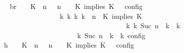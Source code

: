 \begin{isabellebody}
\ \isamarkupfalse%
\ br{}{\isacharcolon}\ {\isacartoucheopen}{\isasymrho}\ {\isasymin}\ {\isasymlbrakk}\ {\isacharparenleft}{\isacharparenleft}K\ {\isasymnot}{\isasymUp}\ n{\isacharparenright}\ {\isacharhash}\ {\isasymGamma}{\isacharparenright}{\isacharcomma}\ n\ {\isasymturnstile}\ {\isasymPsi}\ {\isasymtriangleright}\ {\isacharparenleft}{\isacharparenleft}K\ implies\ K\ {\isacharhash}\ {\isasymPhi}{\isacharparenright}\ {\isasymrbrakk}\isactrlsub c\isactrlsub o\isactrlsub n\isactrlsub f\isactrlsub i\isactrlsub g\isanewline
\ \ \ \ \ \ \ \ \ \ \ \ \ \ \ \ {\isasymLongrightarrow}\ {\isasymexists}{\isasymGamma}\isactrlsub k\ {\isasymPsi}\isactrlsub k\ {\isasymPhi}\isactrlsub k\ k{\isachardot}\ {\isacharparenleft}{\isacharparenleft}{\isasymGamma}{\isacharcomma}\ n\ {\isasymturnstile}\ {\isacharparenleft}{\isacharparenleft}K\ implies\ K\ {\isacharhash}\ {\isasymPsi}{\isacharparenright}\ {\isasymtriangleright}\ {\isasymPhi}{\isacharparenright}\isanewline
\ \ \ \ \ \ \ \ \ \ \ \ \ \ \ \ \ \ \ \ \ \ \ \ \ \ \ \ \ \ \ \ \ \ \ \ {\isasymhookrightarrow}\isactrlbsup k\isactrlesup \ {\isacharparenleft}{\isasymGamma}\isactrlsub k{\isacharcomma}\ Suc\ n\ {\isasymturnstile}\ {\isasymPsi}\isactrlsub k\ {\isasymtriangleright}\ {\isasymPhi}\isactrlsub k{\isacharparenright}{\isacharparenright}\isanewline
\ \ \ \ \ \ \ \ \ \ \ \ \ \ \ \ \ \ {\isasymand}\ {\isasymrho}\ {\isasymin}\ {\isasymlbrakk}\ {\isasymGamma}\isactrlsub k{\isacharcomma}\ Suc\ n\ {\isasymturnstile}\ {\isasymPsi}\isactrlsub k\ {\isasymtriangleright}\ {\isasymPhi}\isactrlsub k\ {\isasymrbrakk}\isactrlsub c\isactrlsub o\isactrlsub n\isactrlsub f\isactrlsub i\isactrlsub g{\isacartoucheclose}\isanewline
\ \ \ \ \ \ \isamarkupfalse%
\ {\isacharminus}\isanewline
\ \ \ \ \ \ \ \ \isamarkupfalse%
\ h{}{\isacharcolon}\ {\isacartoucheopen}{\isasymrho}\ {\isasymin}\ {\isasymlbrakk}\ {\isacharparenleft}{\isacharparenleft}K\ {\isasymnot}{\isasymUp}\ n{\isacharparenright}\ {\isacharhash}\ {\isasymGamma}{\isacharparenright}{\isacharcomma}\ n\ {\isasymturnstile}\ {\isasymPsi}\ {\isasymtriangleright}\ {\isacharparenleft}{\isacharparenleft}K\ implies\ K\ {\isacharhash}\ {\isasymPhi}{\isacharparenright}\ {\isasymrbrakk}\isactrlsub c\isactrlsub o\isactrlsub n\isactrlsub f\isactrlsub i\isactrlsub g{\isacartoucheclose}\isanewline

\end{isabellebody}
